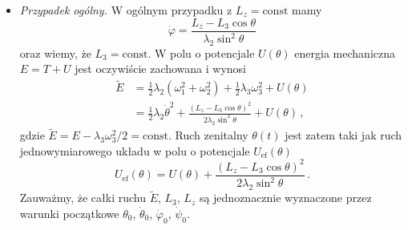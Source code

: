 \documentclass[../main.tex]{subfiles}
\begin{document}
\begin{itemize}
    \item \textit{Przypadek ogólny.} W ogólnym przypadku z \(L_z=\text{const}\) mamy
    \begin{equation*}
        \dot\varphi=\frac{L_z-L_3\cos\theta}{\lambda_2\sin^2\theta}
    \end{equation*}
    oraz wiemy, że \(L_3=\text{const}\). W polu o potencjale \(U(\theta)\) energia mechaniczna
    \(E=T+U\) jest oczywiście zachowana i wynosi
    \begin{equation*}
    \begin{split}
        \widetilde{E}&=\frac{1}{2}\lambda_2(\omega_1^2+\omega_2^2)+\frac{1}{2}\lambda_3\omega_3^2+U(\theta)\\
        &=\frac{1}{2}\lambda_2\dot{\theta}^2+\frac{(L_z-L_3\cos\theta)^2}{2\lambda_2\sin^2\theta}+U(\theta)\,,
    \end{split}
    \end{equation*}
    gdzie \(\widetilde{E}=E-\lambda_3\omega_3^2/2=\text{const}\). Ruch zenitalny \(\theta(t)\) jest
    zatem taki jak ruch jednowymiarowego układu w polu o potencjale \(U_\text{ef}(\theta)\)
    \begin{equation*}
        U_\text{ef}(\theta)=U(\theta)+\frac{(L_z-L_3\cos\theta)^2}{2\lambda_2\sin^2\theta}\,.
    \end{equation*}
    Zauważmy, że całki ruchu \(\widetilde{E}\), \(L_3\), \(L_z\) są jednoznacznie wyznaczone przez
    warunki początkowe \(\theta_0\), \(\dot{\theta}_0\), \(\dot{\varphi}_0\), \(\dot{\psi}_0\). 
    \medskip
    

\end{itemize}
\end{document}

